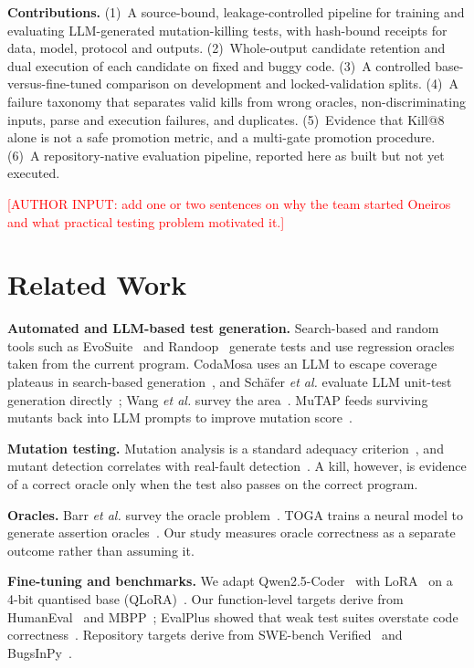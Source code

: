 \documentclass[conference,a4paper]{IEEEtran}
\makeatletter
\newcommand{\killk}[1]{Kill@#1}
\newcommand{\authorinput}[1]{\textcolor{red}{[AUTHOR INPUT: #1]}}
\makeatother
\begin{document}
\textbf{Contributions.} (1)~A source-bound, leakage-controlled pipeline for training
and evaluating LLM-generated mutation-killing tests, with hash-bound receipts for data,
model, protocol and outputs. (2)~Whole-output candidate retention and dual execution
of each candidate on fixed and buggy code. (3)~A controlled base-versus-fine-tuned
comparison on development and locked-validation splits. (4)~A failure taxonomy that
separates valid kills from wrong oracles, non-discriminating inputs, parse and
execution failures, and duplicates. (5)~Evidence that \killk{8} alone is not a safe
promotion metric, and a multi-gate promotion procedure. (6)~A repository-native
evaluation pipeline, reported here as built but not yet executed.

\authorinput{add one or two sentences on why the team started Oneiros and what
practical testing problem motivated it.}

\section{Related Work}

\textbf{Automated and LLM-based test generation.} Search-based and random tools such
as EvoSuite~\cite{fraser2011evosuite} and Randoop~\cite{pacheco2007randoop} generate
tests and use regression oracles taken from the current program. CodaMosa uses an LLM
to escape coverage plateaus in search-based generation~\cite{lemieux2023codamosa}, and
Sch\"afer \emph{et al.} evaluate LLM unit-test generation directly~\cite{schafer2024llmunit};
Wang \emph{et al.} survey the area~\cite{wang2024testingsurvey}. MuTAP feeds surviving
mutants back into LLM prompts to improve mutation score~\cite{dakhel2024mutap}.

\textbf{Mutation testing.} Mutation analysis is a standard adequacy
criterion~\cite{jia2011mutation,papadakis2019mutation}, and mutant detection
correlates with real-fault detection~\cite{just2014mutants}. A kill, however, is
evidence of a correct oracle only when the test also passes on the correct program.

\textbf{Oracles.} Barr \emph{et al.} survey the oracle problem~\cite{barr2015oracle}.
TOGA trains a neural model to generate assertion oracles~\cite{dinella2022toga}. Our
study measures oracle correctness as a separate outcome rather than assuming it.

\textbf{Fine-tuning and benchmarks.} We adapt Qwen2.5-Coder~\cite{hui2024qwen25coder}
with LoRA~\cite{hu2021lora} on a 4-bit quantised base (QLoRA)~\cite{dettmers2023qlora}.
Our function-level targets derive from HumanEval~\cite{chen2021codex} and
MBPP~\cite{austin2021mbpp}; EvalPlus showed that weak test suites overstate code
correctness~\cite{liu2023evalplus}. Repository targets derive from SWE-bench
Verified~\cite{jimenez2023swebench} and BugsInPy~\cite{widyasari2020bugsinpy}.
\end{document}
